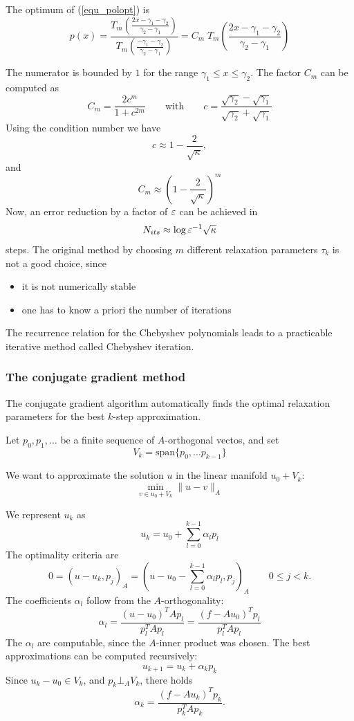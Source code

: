 The optimum of (\ref{equ_polopt}) is 
$$
p(x) = \frac{T_m \left( \frac{2x-\gamma_1-\gamma_2}{\gamma_2-\gamma_1} \right)}
        {T_m \left( \frac{-\gamma_1-\gamma_2}{\gamma_2-\gamma_1} \right)}
        = C_m \; T_m \left( \frac{2x-\gamma_1-\gamma_2}{\gamma_2-\gamma_1} \right)
$$

The numerator is bounded by $1$ for the range $\gamma_1 \leq x \leq \gamma_2$.
The factor $C_m$ can be computed as
$$
C_m
        = \frac{2 c^m}{1+c^{2m}}
\qquad \mbox{with} \qquad
        c = \frac{\sqrt{\gamma_2} - \sqrt{\gamma_1}}{\sqrt{\gamma_2} + \sqrt{\gamma_1}}
$$
Using the condition number we have
$$
c \approx 1 - \frac{2}{\sqrt \kappa},
$$
and
$$
C_m \approx
( 1 - \frac{2}{\sqrt \kappa})^m
$$
Now, an error reduction by a factor of $\varepsilon$ can be achieved in
$$
N_{its} \approx \log \varepsilon^{-1} \sqrt{\kappa}
$$
steps. The original method by choosing $m$ different relaxation parameters 
$\tau_k$ is not a good choice, since
\begin{itemize}
\item it is not numerically stable
\item one has to know a priori the number of iterations 
\end{itemize}
The recurrence relation for the Chebyshev polynomials leads to a practicable
iterative method called Chebyshev iteration. 

\subsubsection{The conjugate gradient method}

The conjugate gradient algorithm automatically finds the optimal 
relaxation parameters for the best $k$-step approximation.



Let $p_0, p_1, \ldots$ be a finite sequence of $A$-orthogonal vectos, and set 
$$
V_k = \mbox{span} \{ p_0, \ldots p_{k-1} \}
$$

We want to approximate the solution $u$ in the linear manifold $u_0+ V_k$:
$$
\min_{v \in u_0 + V_k} \| u - v \|_A 
$$

We represent $u_k$ as
$$
u_k = u_0 + \sum_{l=0}^{k-1} \alpha_l p_l
$$
The optimality criteria are
$$
0 = (u-u_k, p_j)_A = (u - u_0 - \sum_{l=0}^{k-1} \alpha_l p_l, p_j)_A 
 \qquad   0 \leq j < k.
$$
The coefficients $\alpha_l$ follow from the $A$-orthogonality:
$$
\alpha_l = \frac{(u-u_0)^T A p_l}{p_l^T A p_l} = \frac{(f-A u_0)^T p_l}{p_l^T A p_l} 
$$
The $\alpha_l$ are computable, since the $A$-inner product was chosen.
The best approximations can be computed recursively:
$$
u_{k+1} = u_k + \alpha_k p_k
$$
Since $u_k - u_0 \in V_k$, and $p_k \bot_A V_k$, there holds
$$
\alpha_k = \frac{(f-A u_k)^T p_k}{p_k^T A p_k}.
$$


